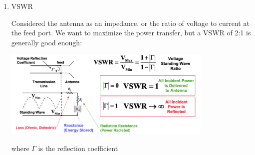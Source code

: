 \documentclass[10pt]{article}
\begin{document}
\begin{enumerate}
	\item VSWR 
	
	Considered the antenna as an impedance, or the ratio of voltage to current at the feed port.
	We want to maximize the power transfer, but a VSWR of 2:1 is generally good enough:
	
	\includegraphics[width=0.79\textwidth]{figs/VSWR.png}
	
	where $\Gamma$ is the reflection coefficient



\end{enumerate}
\end{document}
